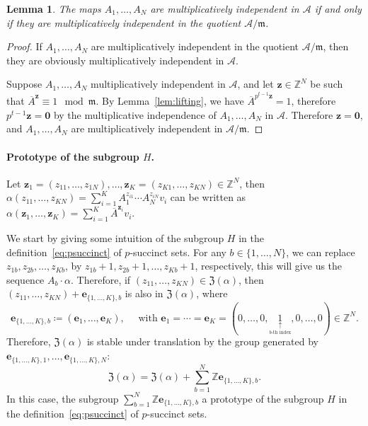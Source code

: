 \documentclass[letterpaper, 11pt, thm-restate]{article}
\numberwithin{equation}{section}
\newcommand{\Z}{\mathbb{Z}}
\newcommand{\mA}{\mathcal{A}}
\newcommand{\mZ}{\mathfrak{Z}}
\newcommand{\be}{\boldsymbol{e}}
\newcommand{\bz}{\boldsymbol{z}}
\newcommand{\bzer}{\boldsymbol{0}}
\newcommand{\oA}{\overline{A}}
\newcommand{\frm}{\mathfrak{m}}
\newtheorem{lem}[thrm]{Lemma}
\theoremstyle{definition}
\theoremstyle{definition}
\theoremstyle{definition}
\begin{document}
\begin{lem}\label{lem:independentmodq}
    The maps $A_1, \ldots, A_N$ are multiplicatively independent in $\mA$ if and only if they are multiplicatively independent in the quotient $\mA/\frm$.
\end{lem}
\begin{proof}
    If $A_1, \ldots, A_N$ are multiplicatively independent in the quotient $\mA/\frm$, then they are obviously multiplicatively independent in $\mA$.
    
    Suppose $A_1, \ldots, A_N$ multiplicatively independent in $\mA$, and let $\bz \in \Z^N$ be such that $\oA^{\bz} \equiv 1 \mod \frm$.
    By Lemma~\ref{lem:lifting}, we have $\oA^{p^{t-1}\bz} = 1$, therefore $p^{t-1}\bz = \bzer$ by the multiplicative independence of $A_1, \ldots, A_N$ in $\mA$.
    Therefore $\bz = \bzer$, and $A_1, \ldots, A_N$ are multiplicatively independent in $\mA/\frm$.
\end{proof}

\paragraph{Prototype of the subgroup $H$.}

Let $\bz_1 = (z_{11}, \ldots, z_{1N}), \ldots, \bz_K = (z_{K1}, \ldots, z_{KN}) \in \Z^N$, then $\alpha(z_{11}, \ldots, z_{KN}) = \sum_{i = 1}^K A_1^{z_{i1}} \cdots A_{N}^{z_{iN}} v_i$ can be written as $\alpha(\bz_1, \ldots, \bz_K) = \sum_{i = 1}^K \oA^{\bz_i} v_i$.

We start by giving some intuition of the subgroup $H$ in the definition~\eqref{eq:psuccinct} of $p$-succinct sets.
For any $b \in \{1, \ldots, N\}$, we can replace $z_{1b}, z_{2b}, \ldots, z_{Kb}$, by $z_{1b}+1, z_{2b}+1, \ldots, z_{Kb}+1$, respectively, this will give us the sequence $A_b \cdot \alpha$.
Therefore, if $(z_{11}, \ldots, z_{KN}) \in \mZ(\alpha)$, then $(z_{11}, \ldots, z_{KN}) + \be_{\{1, \ldots, K\}, b}$ is also in $\mZ(\alpha)$, where
\[
\be_{\{1, \ldots, K\}, b} \coloneqq (\be_1, \ldots, \be_K), \quad \text{ with } \be_1 = \cdots = \be_K = (0, \ldots, 0, \underset{\underset{\text{$b$-th index}}{\uparrow}}{1}, 0, \ldots, 0) \in \Z^N.
\]
Therefore, $\mZ(\alpha)$ is stable under translation by the group generated by $\be_{\{1, \ldots, K\}, 1}, \ldots, \be_{\{1, \ldots, K\}, N}$:
\[
\mZ(\alpha) = \mZ(\alpha) + \sum_{b = 1}^N \Z \be_{\{1, \ldots, K\}, b}.
\]
In this case, the subgroup $\sum_{b = 1}^N \Z \be_{\{1, \ldots, K\}, b}$ a prototype of the subgroup $H$ in the definition~\eqref{eq:psuccinct} of $p$-succinct sets.
\end{document}
